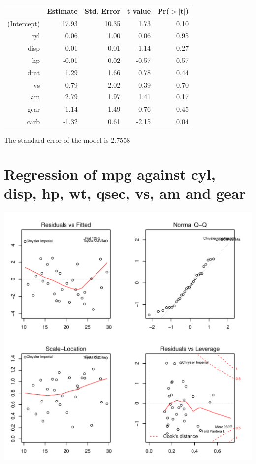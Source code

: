 \documentclass{article}\usepackage[]{graphicx}\usepackage[]{color}
\makeatletter
\def\maxwidth{ %
  \ifdim\Gin@nat@width>\linewidth
    \linewidth
  \else
    \Gin@nat@width
  \fi
}
\newenvironment{knitrout}{}{} %
\makeatother
\begin{document}
\begin{table}[ht]
\centering
\begin{tabular}{rrrrr}
  \hline
 & Estimate & Std. Error & t value & Pr($>$$|$t$|$) \\ 
  \hline
(Intercept) & 17.93 & 10.35 & 1.73 & 0.10 \\ 
  cyl & 0.06 & 1.00 & 0.06 & 0.95 \\ 
  disp & -0.01 & 0.01 & -1.14 & 0.27 \\ 
  hp & -0.01 & 0.02 & -0.57 & 0.57 \\ 
  drat & 1.29 & 1.66 & 0.78 & 0.44 \\ 
  vs & 0.79 & 2.02 & 0.39 & 0.70 \\ 
  am & 2.79 & 1.97 & 1.41 & 0.17 \\ 
  gear & 1.14 & 1.49 & 0.76 & 0.45 \\ 
  carb & -1.32 & 0.61 & -2.15 & 0.04 \\ 
   \hline
\end{tabular}
\end{table}




The standard error of the model is 2.7558

\newpage

\section{Regression of mpg against cyl, disp, hp, wt, qsec, vs, am and gear }
\begin{knitrout}
\color{fgcolor}

{\centering \includegraphics[width=\maxwidth]{figure/lm-cyl-disp-hp-wt-qsec-vs-am-gear} 

}



\end{knitrout}
\end{document}

